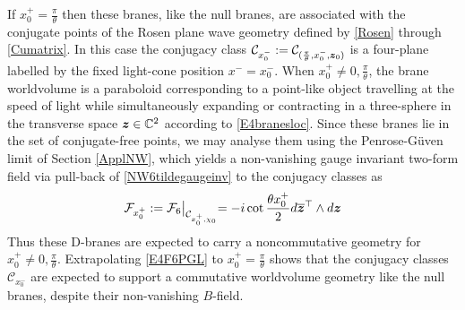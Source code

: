 If $x_0^+=\frac\pi\theta$ then these branes, like the null branes, are
associated with the conjugate points of the Rosen plane wave geometry defined by
\eqref{Rosen} through \eqref{Cumatrix}. In this case the conjugacy class
$\mathcal{C}_{x_0^-}:=\mathcal{C}_{(\frac\pi\theta,x_0^-,{{\boldsymbol {z} }}_0)}$ is a
four-plane labelled by the fixed light-cone position $x^-=x_0^-$. When
$x_0^+\neq0,\frac\pi\theta$, the brane worldvolume is a paraboloid corresponding
to a point-like object travelling at the speed of light while simultaneously
expanding or contracting in a three-sphere in the transverse space ${{\boldsymbol {z} }}\in{\mathbb C}^2$
according to \eqref{E4branesloc}. Since these branes lie in the set of
conjugate-free points, we may analyse them using the Penrose-G\"uven limit of
Section \ref{ApplNW}, which yields a non-vanishing gauge invariant two-form
field via pull-back of \eqref{NW6tildegaugeinv} to the conjugacy classes as
\begin{equation}
  \label{E4F6PGL}
  \mathcal{F}_{x_0^+}:=\mathcal{F}_6\bigl|_{\mathcal{C}_{x_0^+,\chi_0}}
  =- i\cot\frac{\theta x_0^+}2 d\overline{{{\boldsymbol {z} }}}^{ \top}\wedge d{{\boldsymbol {z} }}
\end{equation}
Thus these D-branes are expected to carry a noncommutative geometry for
$x_0^+\neq0,\frac\pi\theta$. Extrapolating \eqref{E4F6PGL} to $x_0^+=\frac\pi\theta$
shows that the conjugacy classes $\mathcal{C}_{x_0^-}$ are expected to support a
commutative worldvolume geometry like the null branes, despite their
non-vanishing $B$-field.

